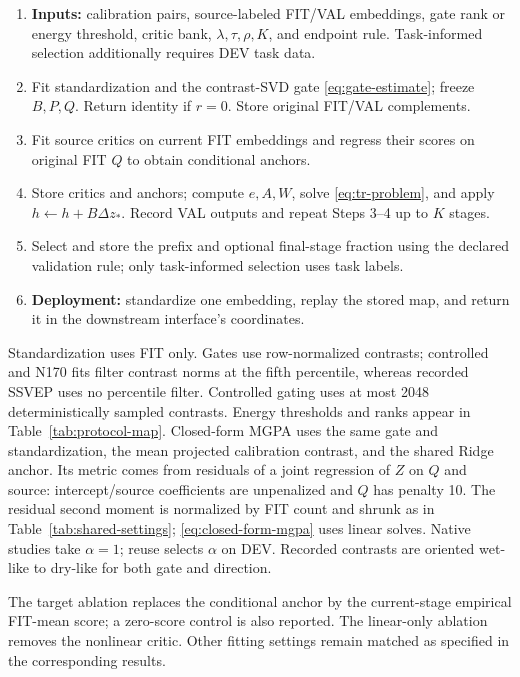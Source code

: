 \begin{algorithm}[htbp]
\small
\caption{Iterative MGPA: fit once, replay without source labels}
\label{fig:algorithm-main}
\begin{enumerate}
\setlength{\itemsep}{2pt}
\item \textbf{Inputs:} calibration pairs, source-labeled FIT/VAL embeddings,
gate rank or energy threshold, critic bank, $\lambda,\tau,\rho,K$, and
endpoint rule. Task-informed selection additionally requires DEV task data.
\item Fit standardization and the contrast-SVD gate \eqref{eq:gate-estimate};
freeze $B,P,Q$. Return identity if $r=0$. Store original FIT/VAL complements.
\item Fit source critics on current FIT embeddings and regress their scores
on original FIT $Q$ to obtain conditional anchors.
\item Store critics and anchors; compute $e,A,W$, solve
\eqref{eq:tr-problem}, and apply $h\leftarrow h+B\Delta z_*$. Record VAL
outputs and repeat Steps 3--4 up to $K$ stages.
\item Select and store the prefix and optional final-stage fraction using
the declared validation rule; only task-informed selection uses task labels.
\item \textbf{Deployment:} standardize one embedding, replay the stored map,
and return it in the downstream interface's coordinates.
\end{enumerate}
\end{algorithm}

Standardization uses FIT only. Gates use row-normalized contrasts;
controlled and N170 fits filter contrast norms at the fifth percentile,
whereas recorded SSVEP uses no percentile filter. Controlled gating uses
at most 2048 deterministically sampled contrasts. Energy thresholds and
ranks appear in Table~\ref{tab:protocol-map}.
Closed-form MGPA uses the same gate and standardization, the mean projected
calibration contrast, and the shared Ridge anchor. Its metric comes from
residuals of a joint regression of $Z$ on $Q$ and source: intercept/source
coefficients are unpenalized and $Q$ has penalty 10. The residual second
moment is normalized by FIT count and shrunk as in
Table~\ref{tab:shared-settings}; \eqref{eq:closed-form-mgpa} uses linear
solves. Native studies take $\alpha=1$; reuse selects $\alpha$ on DEV.
Recorded contrasts are oriented wet-like to dry-like for both gate and direction.

The target ablation replaces the conditional anchor by the current-stage
empirical FIT-mean score; a zero-score control is also reported. The
linear-only ablation removes the nonlinear critic. Other fitting settings
remain matched as specified in the corresponding results.

